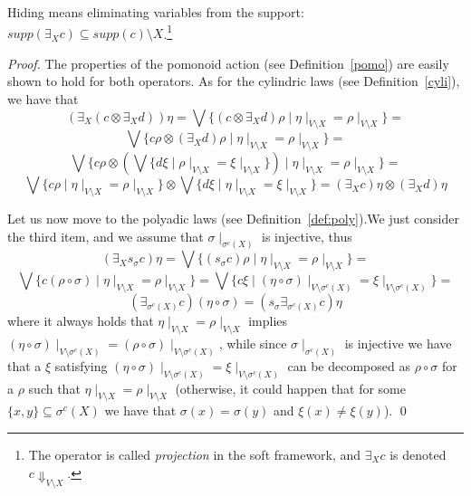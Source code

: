 \documentclass{llncs}
\begin{document}
Hiding means eliminating variables from the support:
$supp(\exists_X c) \subseteq supp({c}) \setminus X$.\footnote{The operator
	is called \emph{projection} in the soft framework,
	and $\exists_X c$ is denoted $c\Downarrow_{V\setminus X}$.}

\begin{proof}
%
The properties of the pomonoid action (see Definition~\ref{pomo})
are easily shown to hold for both operators. 
%
As for the cylindric laws (see Definition~\ref{cyli}), we have that 
\[(\exists_X (c \otimes \exists_X d)) \eta = 
\bigvee \{(c \otimes \exists_X d) \rho \mid \eta\mid_{V \setminus X} = \rho\mid_{V \setminus X}\} =\]
\[\bigvee \{c\rho \otimes (\exists_X d) \rho \mid \eta\mid_{V \setminus X} = \rho\mid_{V \setminus X}\} = \]
\[\bigvee \{c\rho \otimes  (\bigvee \{d \xi \mid \rho\mid_{V \setminus X} = \xi\mid_{V \setminus X}\}) \mid \eta\mid_{V \setminus X} = \rho\mid_{V \setminus X}\} =\]
\[\bigvee \{c\rho \mid \eta\mid_{V \setminus X} = \rho\mid_{V \setminus X}\} \otimes
\bigvee \{d \xi \mid \eta\mid_{V \setminus X} = \xi\mid_{V \setminus X}\} =
(\exists_X c) \eta \otimes (\exists_X d) \eta \]

Let us now move to the polyadic laws (see Definition~\ref{def:poly}).We just consider the third item, 
and we assume that $\sigma \mid_{\sigma^c(X)}$ is injective, thus
\[(\exists_X s_\sigma c) \eta = \bigvee \{(s_\sigma c) \rho \mid \eta\mid_{V \setminus X} = \rho\mid_{V \setminus X}\} =\]
\[\bigvee \{c (\rho \circ \sigma) \mid \eta\mid_{V \setminus X} = \rho\mid_{V \setminus X}\} = 
\bigvee \{c\xi \mid (\eta \circ \sigma)\mid_{V \setminus \sigma^{c}(X)} = \xi\mid_{V \setminus \sigma^{c}(X)}\} =\]
\[(\exists_{\sigma^c(X)} c) (\eta \circ \sigma) = (s_\sigma \exists_{\sigma^c(X)} c) \eta\]
\noindent
where it always holds that $\eta\mid_{V \setminus X} = \rho\mid_{V \setminus X}$ implies $(\eta\circ \sigma)\mid_{V \setminus \sigma^{c}(X)} = (\rho\circ \sigma)\mid_{V \setminus \sigma^{c}(X)}$,
while since $\sigma \mid_{\sigma^c(X)}$ is injective we have that
a $\xi$ satisfying $(\eta \circ \sigma)\mid_{V \setminus \sigma^{c}(X)} = \xi\mid_{V \setminus \sigma^{c}(X)}$ can be decomposed as $\rho\circ \sigma$
for a $\rho$ such that $\eta\mid_{V \setminus X} = \rho\mid_{V \setminus X}$
(otherwise, it could happen that for some $\{x, y\} \subseteq \sigma^c(X)$ we have that $\sigma(x) =\sigma(y)$ and 
$\xi(x) \neq \xi(y)$).
\qed
\end{proof}
\end{document}
